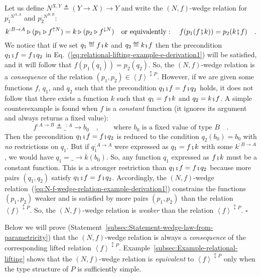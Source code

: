Let us define $N^{X,Y}\triangleq\left(Y\rightarrow X\right)\rightarrow Y$
and write the $\left(N,f\right)$-wedge relation for $p_{1}^{:N^{A,A}}$
and $p_{2}^{:N^{B,B}}$:
\begin{equation}
k^{:B\rightarrow A}\triangleright(p_{1}\triangleright f^{\uparrow N})=k\triangleright(p_{2}\triangleright f^{\downarrow N})\quad\text{or equivalently}:\quad f(p_{1}(f\bef k))=p_{2}(k\bef f)\quad.\label{eq:N-f-wedge-relation-example-derivation1}
\end{equation}
We notice that if we set $q_{1}\triangleq f\bef k$ and $q_{2}\triangleq k\bef f$
then the precondition $q_{1}\bef f=f\bef q_{2}$ in Eq.~(\ref{eq:relational-lifting-example-e-derivation1})
will be satisfied, and it will follow that $f(p_{1}(q_{1}))=p_{2}(q_{2})$.
So, the $\left(N,f\right)$-wedge relation is a \emph{consequence}
of the relation $(p_{1},p_{2})\in\left<f\right>^{\updownarrow P}$.
However, if we are given some functions $f$, $q_{1}$, and $q_{2}$
such that the precondition $q_{1}\bef f=f\bef q_{2}$ holds, it does
not follow that there exists a function $k$ such that $q_{1}=f\bef k$
and $q_{2}=k\bef f$. A simple counterexample is found when $f$ is
a \emph{constant} function (it ignores its argument and always returns
a fixed value):
\[
f^{:A\rightarrow B}\triangleq\_^{:A}\rightarrow b_{0}\quad,\quad\quad\text{where }b_{0}\text{ is a fixed value of type }B\quad.
\]
Then the precondition $q_{1}\bef f=f\bef q_{2}$ is reduced to the
condition $q_{2}(b_{0})=b_{0}$ with \emph{no} restrictions on $q_{1}$.
But if $q_{1}^{:A\rightarrow A}$ were expressed as $q_{1}=f\bef k$
with some $k^{:B\rightarrow A}$, we would have $q_{1}=\_\rightarrow k(b_{0})$.
So, any function $q_{1}$ expressed as $f\bef k$ must be a constant
function. This is a stronger restriction than $q_{1}\bef f=f\bef q_{2}$
because more pairs $\left(q_{1},q_{2}\right)$ satisfy $q_{1}\bef f=f\bef q_{2}$.
Accordingly, the $\left(N,f\right)$-wedge relation~(\ref{eq:N-f-wedge-relation-example-derivation1})
constrains the functions $\left(p_{1},p_{2}\right)$ weaker and is
satisfied by more pairs $\left(p_{1},p_{2}\right)$ than the relation
$\left<f\right>^{\updownarrow P}$. So, the $\left(N,f\right)$-wedge
relation is\emph{ weaker} than the relation $\left<f\right>^{\updownarrow P}$.
$\square$

Below we will prove (Statement~\ref{subsec:Statement-wedge-law-from-parametricity})
that the $\left(N,f\right)$-wedge relation is always a \emph{consequence}
of the corresponding lifted relation $\left<f\right>^{\updownarrow P}$.
Example~\ref{subsec:Example-relational-lifting} shows that the $\left(N,f\right)$-wedge
relation is \emph{equivalent} to $\left<f\right>^{\updownarrow P}$
only when the type structure of $P$ is sufficiently simple.

